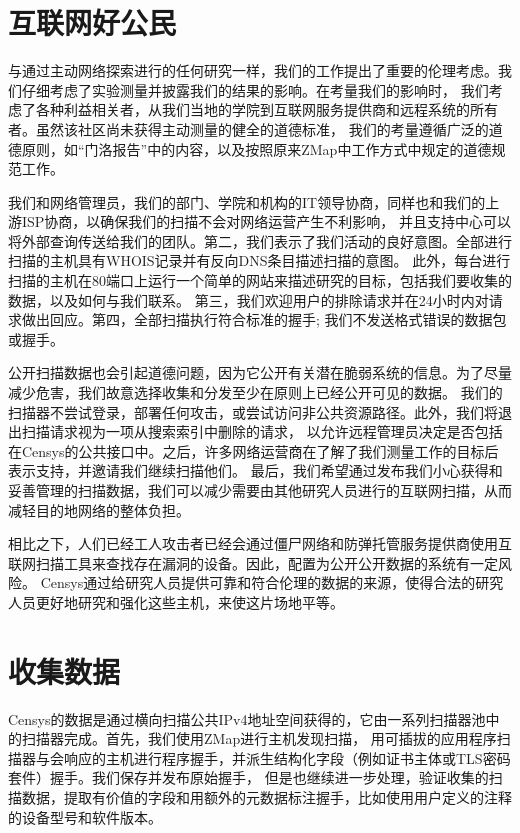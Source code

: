 \section{互联网好公民}

与通过主动网络探索进行的任何研究一样，我们的工作提出了重要的伦理考虑。我们仔细考虑了实验测量并披露我们的结果的影响。在考量我们的影响时，
我们考虑了各种利益相关者，从我们当地的学院到互联网服务提供商和远程系统的所有者。虽然该社区尚未获得主动测量的健全的道德标准，
我们的考量遵循广泛的道德原则，如“门洛报告”中的内容，以及按照原来ZMap中工作方式中规定的道德规范工作。

我们和网络管理员，我们的部门、学院和机构的IT领导协商，同样也和我们的上游ISP协商，以确保我们的扫描不会对网络运营产生不利影响，
并且支持中心可以将外部查询传送给我们的团队。第二，我们表示了我们活动的良好意图。全部进行扫描的主机具有WHOIS记录并有反向DNS条目描述扫描的意图。
此外，每台进行扫描的主机在80端口上运行一个简单的网站来描述研究的目标，包括我们要收集的数据，以及如何与我们联系。
第三，我们欢迎用户的排除请求并在24小时内对请求做出回应。第四，全部扫描执行符合标准的握手; 我们不发送格式错误的数据包或握手。

公开扫描数据也会引起道德问题，因为它公开有关潜在脆弱系统的信息。为了尽量减少危害，我们故意选择收集和分发至少在原则上已经公开可见的数据。
我们的扫描器不尝试登录，部署任何攻击，或尝试访问非公共资源路径。此外，我们将退出扫描请求视为一项从搜索索引中删除的请求，
以允许远程管理员决定是否包括在Censys的公共接口中。之后，许多网络运营商在了解了我们测量工作的目标后表示支持，并邀请我们继续扫描他们。
最后，我们希望通过发布我们小心获得和妥善管理的扫描数据，我们可以减少需要由其他研究人员进行的互联网扫描，从而减轻目的地网络的整体负担。

相比之下，人们已经工人攻击者已经会通过僵尸网络和防弹托管服务提供商使用互联网扫描工具来查找存在漏洞的设备。因此，配置为公开公开数据的系统有一定风险。
Censys通过给研究人员提供可靠和符合伦理的数据的来源，使得合法的研究人员更好地研究和强化这些主机，来使这片场地平等。

\section{收集数据}

Censys的数据是通过横向扫描公共IPv4地址空间获得的，它由一系列扫描器池中的扫描器完成。首先，我们使用ZMap进行主机发现扫描，
用可插拔的应用程序扫描器与会响应的主机进行程序握手，并派生结构化字段（例如证书主体或TLS密码套件）握手。我们保存并发布原始握手，
但是也继续进一步处理，验证收集的扫描数据，提取有价值的字段和用额外的元数据标注握手，比如使用用户定义的注释的设备型号和软件版本。

